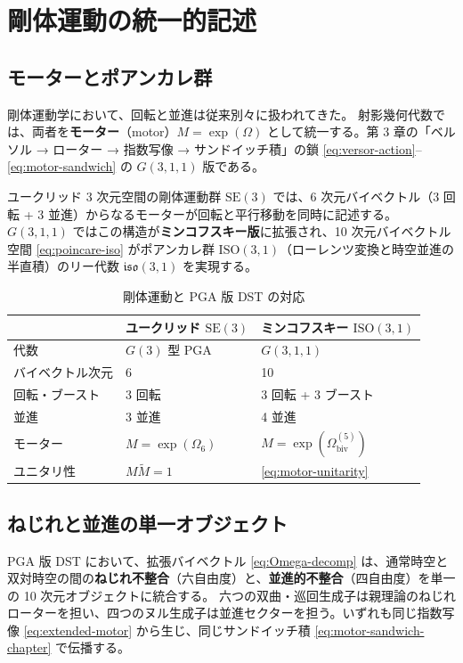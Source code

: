 \documentclass[dvipdfmx,a4paper,oneside]{jsbook}
\numberwithin{equation}{chapter}
\begin{document}
\section{剛体運動の統一的記述}

\subsection{モーターとポアンカレ群}

剛体運動学において、回転と並進は従来別々に扱われてきた。
射影幾何代数では、両者を\textbf{モーター}（motor）\(M = \exp(\Omega)\) として統一する。第 3 章の「ベルソル → ローター → 指数写像 → サンドイッチ積」の鎖 \eqref{eq:versor-action}–\eqref{eq:motor-sandwich} の \(G(3,1,1)\) 版である。

ユークリッド 3 次元空間の剛体運動群 \(\mathrm{SE}(3)\) では、6 次元バイベクトル（3 回転 + 3 並進）からなるモーターが回転と平行移動を同時に記述する。
\(G(3,1,1)\) ではこの構造が\textbf{ミンコフスキー版}に拡張され、10 次元バイベクトル空間 \eqref{eq:poincare-iso} がポアンカレ群 \(\mathrm{ISO}(3,1)\)（ローレンツ変換と時空並進の半直積）のリー代数 \(\mathfrak{iso}(3,1)\) を実現する。

\begin{table}[htbp]
  \centering
  \caption{剛体運動と PGA 版 DST の対応}
  \label{tab:motor-comparison}
  \begin{tabular}{@{}lll@{}}
    \toprule
    & ユークリッド \(\mathrm{SE}(3)\) & ミンコフスキー \(\mathrm{ISO}(3,1)\) \\
    \midrule
    代数 & \(G(3)\) 型 PGA & \(G(3,1,1)\) \\
    バイベクトル次元 & 6 & 10 \\
    回転・ブースト & 3 回転 & 3 回転 + 3 ブースト \\
    並進 & 3 並進 & 4 並進 \\
    モーター & \(M = \exp(\Omega_{6})\) & \(M = \exp(\Omega_{\mathrm{biv}}^{(5)})\) \\
    ユニタリ性 & \(M\widetilde{M} = 1\) & \eqref{eq:motor-unitarity} \\
    \bottomrule
  \end{tabular}
\end{table}

\subsection{ねじれと並進の単一オブジェクト}

PGA 版 DST において、拡張バイベクトル \eqref{eq:Omega-decomp} は、通常時空と双対時空の間の\textbf{ねじれ不整合}（六自由度）と、\textbf{並進的不整合}（四自由度）を単一の 10 次元オブジェクトに統合する。
六つの双曲・巡回生成子は親理論のねじれローターを担い、四つのヌル生成子は並進セクターを担う。いずれも同じ指数写像 \eqref{eq:extended-motor} から生じ、同じサンドイッチ積 \eqref{eq:motor-sandwich-chapter} で伝播する。
\end{document}
